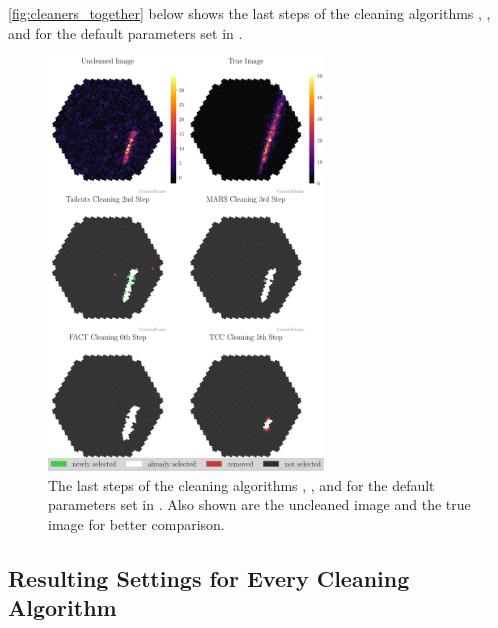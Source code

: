 \autoref{fig:cleaners_together} below shows the last steps of the cleaning algorithms \tailcuts{}, \mars{}, \fact{} and \tcc{}
for the default parameters set in \ctapipe{}.

\begin{figure}
    \centering
    \includegraphics[width=0.65\textwidth]{plots/cleaner_steps/last_steps.pdf}
    \caption{The last steps of the cleaning algorithms \tailcuts{}, \mars{}, \fact{} and \tcc{} for the default
    parameters set in \ctapipe{}. Also shown are the uncleaned image and the true image for better comparison.}%
    \label{fig:cleaners_together}
\end{figure}


\subsection{Resulting Settings for Every Cleaning Algorithm}%
\label{ap:cleaning_settings_all}

